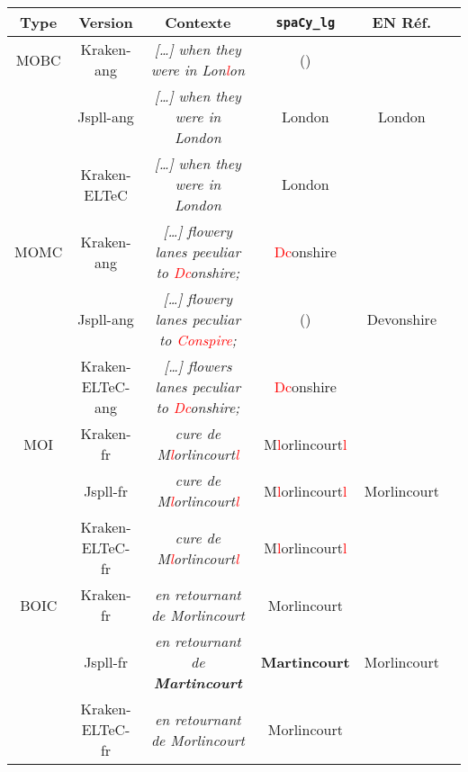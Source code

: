 
\begin{tabular}{|c|c|c|c|c|c|}
\hline
Type &Version & Contexte & \texttt{spaCy\_lg} & EN Réf.\\
\hline
MOBC &Kraken-ang &\textit{[…] when they were in Lon\textcolor{red}{l}on}&() & \\
&Jspll-ang&\textit{[…] when they were in London}&London & London \\
&Kraken-ELTeC&\textit{[…] when they were in London}&London & \\
\hline
MOMC& Kraken-ang&\textit{[…] flowery
lanes peeuliar to \textcolor{red}{Dc}onshire;}&\textcolor{red}{Dc}onshire & \\
&Jspll-ang&\textit{[…] flowery
lanes peculiar to \textcolor{red}{Conspire};}&() & Devonshire\\
&Kraken-ELTeC-ang&\textit{[…] flowers
lanes peculiar to \textcolor{red}{Dc}onshire;}&\textcolor{red}{Dc}onshire &\\
\hline
MOI&Kraken-fr& \textit{cure de M\textcolor{red}{l}orlincourt\textcolor{red}{l}}& M\textcolor{red}{l}orlincourt\textcolor{red}{l} &\\
&Jspll-fr&\textit{cure de  M\textcolor{red}{l}orlincourt\textcolor{red}{l}} &   M\textcolor{red}{l}orlincourt\textcolor{red}{l} & Morlincourt\\
&Kraken-ELTeC-fr& \textit{cure de  M\textcolor{red}{l}orlincourt\textcolor{red}{l}}&  M\textcolor{red}{l}orlincourt\textcolor{red}{l} &  \\
\hline
BOIC&Kraken-fr& \textit{en retournant
de Morlincourt} &Morlincourt & \\
&Jspll-fr&\textit{en retournant
de\textbf{ Martincourt}} & \textbf{Martincourt} & Morlincourt\\
&Kraken-ELTeC-fr&\textit{en retournant
de Morlincourt} &Morlincourt & \\
\hline
\end{tabular}


